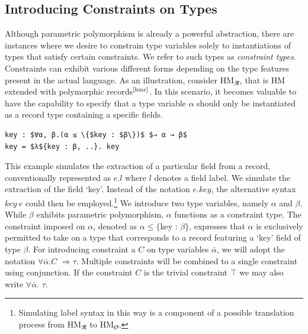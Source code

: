\documentclass[runningheads]{llncs}
\begin{document}
\subsection{Introducing Constraints on Types}
Although parametric polymorphism is already a powerful abstraction, there are
instances where we desire to constrain type variables solely to instantiations
of types that satisfy certain constraints.
We refer to such types as \emph{constraint types}.
Constraints can exhibit various different forms depending on the type features
present in the actual language.
As an illustration, consider HM$_𝓡$, that is HM extended with
polymorphic records$^\text{\cite{hmr}}$.
In this scenario, it becomes valuable to have the capability to specify that a
type variable $α$
should only be instantiated as a record type containing a specific fields.
\begin{example}
  \begin{lstlisting}
key : $∀α, β.(α ≤ \{$key : $β\})$ $⇒ α → β$
key = $λ${key : β, ..}. key
  \end{lstlisting}
\end{example}
This example simulates the extraction of a particular field from a record,
conventionally
represented as $e.l$ where $l$ denotes a field label.
We simulate the extraction of  the field `key'.
Instead of the notation $e.key$, the alternative syntax $key \ e$ could then be
employed.\footnote{
  Simulating label syntax in this way is a component of a possible translation
  process from HM$_𝓡$ to HM$_𝓞$.

}
We introduce two type variables, namely $α$ and $β$. While $β$ exhibits
parametric polymorphism, $α$ functions as a constraint type.
The constraint imposed on $α$, denoted as $α ≤ \{$key : $β\}$, expresses that
$α$ is exclusively permitted to take on a type that corresponds to a record
featuring a `key' field of type $β$.
For introducing constraint a $C$ on type variables $\bar{α}$, we will adopt the
notation $∀\bar{α}.C$ $⇒ τ$.
Multiple constraints will be combined to a single
constraint using conjunction. If the constraint $C$ is the trivial constraint
$⊤$ we may also write $∀\bar{α}.$ $τ$.
\end{document}
